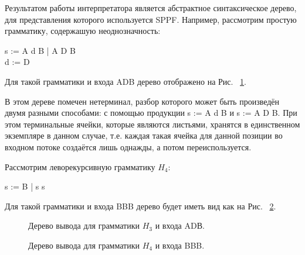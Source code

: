 \documentclass{matmex-diploma-custom}
\begin{document}
Результатом работы интерпретатора является абстрактное синтаксическое дерево, для представления которого используется SPPF. Например, рассмотрим простую грамматику, содержашую неоднозначность:
\begin{center}
    s := A d B | A D B
    \\d := D
\end{center}

Для такой грамматики и входа ADB дерево отображено на Рис. ~\ref{fig8}.

В этом дереве помечен нетерминал, разбор которого может быть произведён двумя разными способами: с помощью продукции s := A d B и s := A D B. При этом терминальные ячейки, которые являются листьями, хранятся в единственном экземпляре в данном случае, т.е. каждая такая ячейка для данной позиции во входном потоке создаётся лишь однажды, а потом переиспользуется.

Рассмотрим леворекурсивную грамматику $H_4$:
\begin{center}
    s := B | s s
\end{center}

Для такой грамматики и входа BBB дерево будет иметь вид как на  Рис. ~\ref{fig9}.


\begin{figure}[h]
\caption{Дерево вывода для грамматики $H_3$ и входа ADВ.}
\label{fig8}
\end{figure}
\pagebreak
\begin{figure}[h]
\caption{Дерево вывода для грамматики $H_4$ и входа BBB.}
\label{fig9}
\end{figure}
\end{document}
